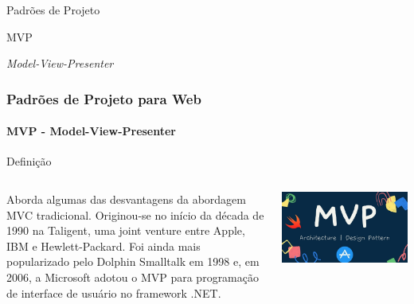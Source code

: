 \documentclass[
	9pt, %
	t, %
]{beamer}
\begin{document}
\begin{frame}
	\begin{center}
		
		\bigskip\bigskip\bigskip\bigskip %
		{\Large Padrões de Projeto}
		
		\bigskip\bigskip %
		{\Huge MVP}
		
		\smallskip
		{\small \textit{Model-View-Presenter}}
	\end{center}

\end{frame}

\begin{frame}
	\frametitle{Padrões de Projeto para Web}
	\framesubtitle{MVP - Model-View-Presenter}

	\begin{block}{Definição}
	\begin{columns}[c] %
			\begin{column}{0.8\textwidth} %
				Aborda algumas das desvantagens da abordagem MVC tradicional. Originou-se no início da década de 1990 na Taligent, uma joint venture entre Apple, IBM e Hewlett-Packard. Foi ainda mais popularizado pelo Dolphin Smalltalk em 1998 e, em 2006, a Microsoft adotou o MVP para programação de interface de usuário no framework .NET.
			\end{column}

			\begin{column}{0.2\textwidth} %
				\includegraphics[width=0.9\linewidth]{Images/mvp_logo.jpg}
			\end{column}
		\end{columns}
	\end{block}

\end{frame}
\end{document}
